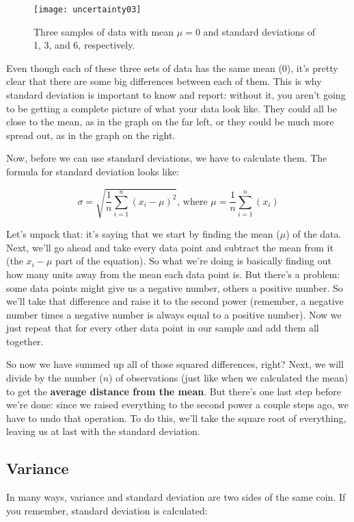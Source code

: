 \begin{figure}[htp]
\texttt{[image: uncertainty03]}
\caption{Three samples of data with mean \(\mu=0\) and standard deviations of 1, 3, and 6, respectively.}
\label{fig:uncertainty03}
\end{figure}

Even though each of these three sets of data has the same mean (0), it's pretty clear that there are some big differences between each of them. This is why standard deviation is important to know and report: without it, you aren't going to be getting a complete picture of what your data look like. They could all be close to the mean, as in the graph on the far left, or they could be much more spread out, as in the graph on the right.

Now, before we can use standard deviations, we have to calculate them. The formula for standard deviation looks like:

\begin{equation}
\sigma = \sqrt{
	\frac{1}{n}\sum_{i=1}^n\left(x_i-\mu\right)^2
	} \text{, where }
	\mu=\frac{1}{n}\sum_{i=1}^n(x_i)
\end{equation}

Let's unpack that: it's saying that we start by finding the mean ($ \mu $) of the data. Next, we'll go ahead and take every data point and subtract the mean from it (the $ x_i-\mu $ part of the equation). So what we're doing is basically finding out how many units away from the mean each data point is. But there's a problem: some data points might give us a negative number, others a positive number. So we'll take that difference and raise it to the second power (remember, a negative number times a negative number is always equal to a positive number). Now we just repeat that for every other data point in our sample and add them all together.

So now we have summed up all of those squared differences, right? Next, we will divide by the number ($ n $) of observations (just like when we calculated the mean) to get the \textbf{average distance from the mean}. But there's one last step before we're done: since we raised everything to the second power a couple steps ago, we have to undo that operation. To do this, we'll take the square root of everything, leaving us at last with the standard deviation.

\subsection{Variance}
In many ways, variance and standard deviation are two sides of the same coin. If you remember, standard deviation is calculated:

